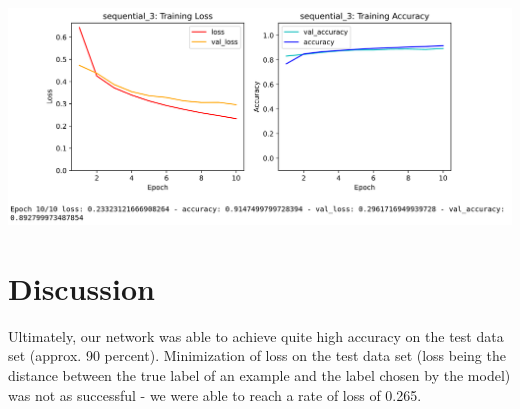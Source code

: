 \documentclass[11pt]{article}
\begin{document}
\begin{center}
\includegraphics[scale=0.25]{W_o_pooling_train}

\section{Discussion}

Ultimately, our network was able to achieve quite high accuracy on the test data set (approx. 90 percent). Minimization of loss on the test data set (loss being the distance between the
true label of an example and the label chosen by the model) was not as successful - we were able to reach a rate of loss of 0.265.

\end{center}
\end{document}
